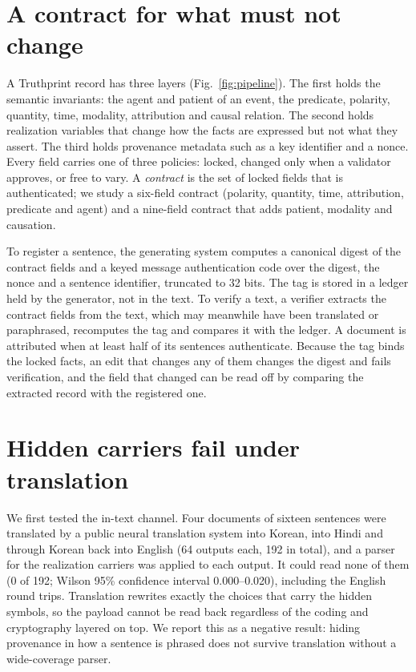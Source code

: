 \documentclass[12pt]{article}
\begin{document}
\section*{A contract for what must not change}

A Truthprint record has three layers (Fig.~\ref{fig:pipeline}). The first holds the semantic invariants: the agent and patient of an event, the predicate, polarity, quantity, time, modality, attribution and causal relation. The second holds realization variables that change how the facts are expressed but not what they assert. The third holds provenance metadata such as a key identifier and a nonce. Every field carries one of three policies: locked, changed only when a validator approves, or free to vary. A \emph{contract} is the set of locked fields that is authenticated; we study a six-field contract (polarity, quantity, time, attribution, predicate and agent) and a nine-field contract that adds patient, modality and causation.

To register a sentence, the generating system computes a canonical digest of the contract fields and a keyed message authentication code\cite{krawczyk1997hmac} over the digest, the nonce and a sentence identifier, truncated to 32 bits. The tag is stored in a ledger held by the generator, not in the text. To verify a text, a verifier extracts the contract fields from the text, which may meanwhile have been translated or paraphrased, recomputes the tag and compares it with the ledger. A document is attributed when at least half of its sentences authenticate. Because the tag binds the locked facts, an edit that changes any of them changes the digest and fails verification, and the field that changed can be read off by comparing the extracted record with the registered one.

\section*{Hidden carriers fail under translation}

We first tested the in-text channel. Four documents of sixteen sentences were translated by a public neural translation system\cite{nllb2024} into Korean, into Hindi and through Korean back into English (64 outputs each, 192 in total), and a parser for the realization carriers was applied to each output. It could read none of them (0 of 192; Wilson 95\% confidence interval 0.000--0.020)\cite{wilson1927}, including the English round trips. Translation rewrites exactly the choices that carry the hidden symbols, so the payload cannot be read back regardless of the coding and cryptography layered on top. We report this as a negative result: hiding provenance in how a sentence is phrased does not survive translation without a wide-coverage parser.
\end{document}
